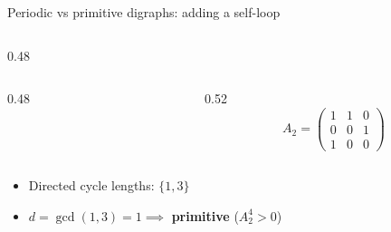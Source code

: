 \documentclass[aspectratio=169]{beamer}\usepackage[]{graphicx}\usepackage[]{xcolor}
\begin{document}
\begin{frame}{Periodic vs primitive digraphs: adding a self-loop}
\begin{columns}[T]
\begin{column}{0.48\textwidth}
\begin{columns}[c]
\begin{column}{0.48\textwidth}
\end{column}
\begin{column}{0.52\textwidth}
\[
A_2 = \begin{pmatrix} 1 & 1 & 0 \\ 0 & 0 & 1 \\ 1 & 0 & 0 \end{pmatrix}
\]
\end{column}
\end{columns}
\vspace{0.3cm}
\begin{itemize}
\item Directed cycle lengths: $\{1, 3\}$
\item $d = \gcd(1, 3) = 1 \implies$ \textbf{primitive} ($A_2^4 > 0$)
\end{itemize}
\end{column}
\end{columns}
\end{frame}
\end{document}
